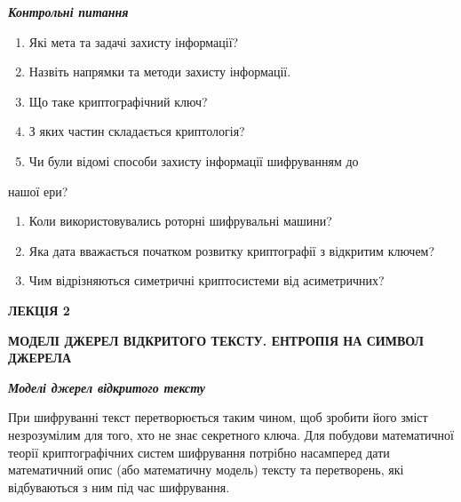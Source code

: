 \documentclass[a4paper]{article}
\newcounter{saveenum}
\newcommand\liststyleWWviiiNumviii{%
\renewcommand\theenumi{\arabic{enumi}}
\renewcommand\theenumii{\alph{enumii}}
\renewcommand\theenumiii{\roman{enumiii}}
\renewcommand\theenumiv{\arabic{enumiv}}
\renewcommand\labelenumi{\theenumi.}
\renewcommand\labelenumii{\theenumii.}
\renewcommand\labelenumiii{\theenumiii.}
\renewcommand\labelenumiv{\theenumiv.}
}
\newcounter{}
\begin{document}
\bigskip

{\centering\bfseries\itshape
Контрольні питання
\par}


\bigskip


\bigskip

\liststyleWWviiiNumviii
\begin{enumerate}
\item Які  мета та задачі захисту інформації?
\item Назвіть напрямки та методи захисту інформації.
\item Що таке криптографічний ключ?
\item З яких частин складається криптологія?
\item Чи були відомі способи захисту інформації шифруванням до
\end{enumerate}
нашої ери?

\liststyleWWviiiNumviii
\setcounter{saveenum}{\value{enumi}}
\begin{enumerate}
\setcounter{enumi}{\value{saveenum}}
\item Коли використовувались роторні шифрувальні машини?
\item Яка дата вважається початком розвитку криптографії з відкритим  ключем?
\item Чим відрізняються симетричні криптосистеми від асиметричних?
\end{enumerate}

\bigskip


\bigskip


\bigskip

{\bfseries
ЛЕКЦІЯ  2}


\bigskip

{\centering\bfseries
МОДЕЛІ  ДЖЕРЕЛ  ВІДКРИТОГО  ТЕКСТУ. ЕНТРОПІЯ  НА  СИМВОЛ  ДЖЕРЕЛА
\par}


\bigskip


\bigskip

{\centering\bfseries\itshape
Моделі джерел відкритого тексту
\par}


\bigskip


\bigskip

При шифруванні текст перетворюється таким чином, щоб зробити його зміст
незрозумілим для того, хто не знає секретного ключа. Для побудови математичної
теорії криптографічних систем шифрування потрібно насамперед дати математичний
опис (або математичну модель) тексту та перетворень, які відбуваються з ним під
час шифрування.
\end{document}
